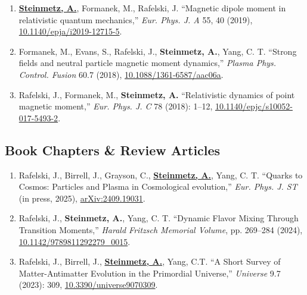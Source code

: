\documentclass[11pt]{article}
\begin{document}
\begin{enumerate}[leftmargin=*,nosep]
    \item \textbf{\href{https://github.com/ajsteinmetz/magnetic-dipole-moment}{Steinmetz, A.}}, Formanek, M., Rafelski, J. ``Magnetic dipole moment in relativistic quantum mechanics,'' \textit{Eur. Phys. J. A} 55, 40 (2019), \href{https://doi.org/10.1140/epja/i2019-12715-5}{10.1140/epja/i2019-12715-5}.
    \item Formanek, M., Evans, S., Rafelski, J., \textbf{Steinmetz, A.}, Yang, C. T. ``Strong fields and neutral particle magnetic moment dynamics,'' \textit{Plasma Phys. Control. Fusion} 60.7 (2018), \href{https://doi.org/10.1088/1361-6587/aac06a}{10.1088/1361-6587/aac06a}.
    \item Rafelski, J., Formanek, M., \textbf{Steinmetz, A.} ``Relativistic dynamics of point magnetic moment,'' \textit{Eur. Phys. J. C} 78 (2018): 1--12, \href{https://doi.org/10.1140/epjc/s10052-017-5493-2}{10.1140/epjc/s10052-017-5493-2}.
\end{enumerate}

\subsection*{Book Chapters \& Review Articles}
\begin{enumerate}[leftmargin=*,nosep]
    \item Rafelski, J., Birrell, J., Grayson, C., \textbf{\href{https://github.com/ajsteinmetz/thesis-collab-project}{Steinmetz, A.}}, Yang, C. T. ``Quarks to Cosmos: Particles and Plasma in Cosmological evolution,'' \textit{Eur. Phys. J. ST} (in press, 2025), \href{https://doi.org/10.48550/arXiv.2409.19031}{arXiv:2409.19031}.
    \item Rafelski, J., \textbf{Steinmetz, A.}, Yang, C. T. ``Dynamic Flavor Mixing Through Transition Moments,'' \textit{Harald Fritzsch Memorial Volume}, pp. 269--284 (2024), \href{https://doi.org/10.1142/9789811292279_0015}{10.1142/9789811292279\_0015}.
    \item Rafelski, J., Birrell, J., \textbf{\href{https://github.com/ajsteinmetz/a-short-survey}{Steinmetz, A.}}, Yang, C.T. ``A Short Survey of Matter-Antimatter Evolution in the Primordial Universe,'' \textit{Universe} 9.7 (2023): 309, \href{https://doi.org/10.3390/universe9070309}{10.3390/universe9070309}.
\end{enumerate}
\end{document}
